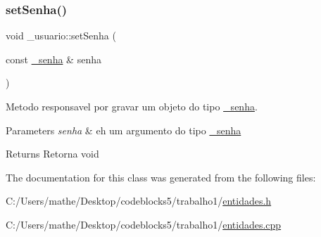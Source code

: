 \subsubsection{\texorpdfstring{setSenha()}{setSenha()}}
{\footnotesize\ttfamily void \+\_\+usuario\+::set\+Senha (\begin{DoxyParamCaption}\item[{const \mbox{\hyperlink{class__senha}{\+\_\+senha}} \&}]{senha }\end{DoxyParamCaption})}



Metodo responsavel por gravar um objeto do tipo \mbox{\hyperlink{class__senha}{\+\_\+senha}}. 


\begin{DoxyParams}{Parameters}
{\em senha} & eh um argumento do tipo \mbox{\hyperlink{class__senha}{\+\_\+senha}} \\
\hline
\end{DoxyParams}
\begin{DoxyReturn}{Returns}
Retorna void 
\end{DoxyReturn}


The documentation for this class was generated from the following files\+:\begin{DoxyCompactItemize}
\item 
C\+:/\+Users/mathe/\+Desktop/codeblocks5/trabalho1/\mbox{\hyperlink{entidades_8h}{entidades.\+h}}\item 
C\+:/\+Users/mathe/\+Desktop/codeblocks5/trabalho1/\mbox{\hyperlink{entidades_8cpp}{entidades.\+cpp}}\end{DoxyCompactItemize}

